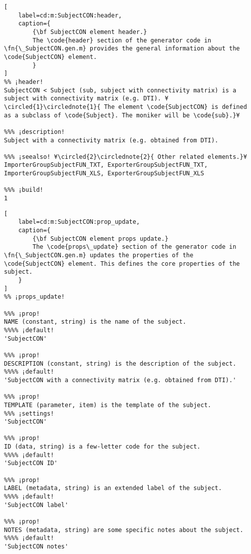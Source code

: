 \documentclass{tufte-handout}
\begin{document}
\begin{lstlisting}[
	label=cd:m:SubjectCON:header,
	caption={
		{\bf SubjectCON element header.}
		The \code{header} section of the generator code in \fn{\_SubjectCON.gen.m} provides the general information about the \code{SubjectCON} element.
		}
]
%% ¡header!
SubjectCON < Subject (sub, subject with connectivity matrix) is a subject with connectivity matrix (e.g. DTI). ¥\circled{1}\circlednote{1}{ The element \code{SubjectCON} is defined as a subclass of \code{Subject}. The moniker will be \code{sub}.}¥

%%% ¡description!
Subject with a connectivity matrix (e.g. obtained from DTI).

%%% ¡seealso! ¥\circled{2}\circlednote{2}{ Other related elements.}¥
ImporterGroupSubjectFUN_TXT, ExporterGroupSubjectFUN_TXT, ImporterGroupSubjectFUN_XLS, ExporterGroupSubjectFUN_XLS

%%% ¡build!
1
\end{lstlisting}

\begin{lstlisting}[
	label=cd:m:SubjectCON:prop_update,
	caption={
		{\bf SubjectCON element props update.}
		The \code{props\_update} section of the generator code in \fn{\_SubjectCON.gen.m} updates the properties of the \code{SubjectCON} element. This defines the core properties of the subject.
	}
]
%% ¡props_update!

%%% ¡prop!
NAME (constant, string) is the name of the subject.
%%%% ¡default!
'SubjectCON'

%%% ¡prop!
DESCRIPTION (constant, string) is the description of the subject.
%%%% ¡default!
'SubjectCON with a connectivity matrix (e.g. obtained from DTI).'

%%% ¡prop!
TEMPLATE (parameter, item) is the template of the subject.
%%% ¡settings!
'SubjectCON'

%%% ¡prop!
ID (data, string) is a few-letter code for the subject.
%%%% ¡default!
'SubjectCON ID'

%%% ¡prop!
LABEL (metadata, string) is an extended label of the subject.
%%%% ¡default!
'SubjectCON label'

%%% ¡prop!
NOTES (metadata, string) are some specific notes about the subject.
%%%% ¡default!
'SubjectCON notes'
\end{lstlisting}
\end{document}
